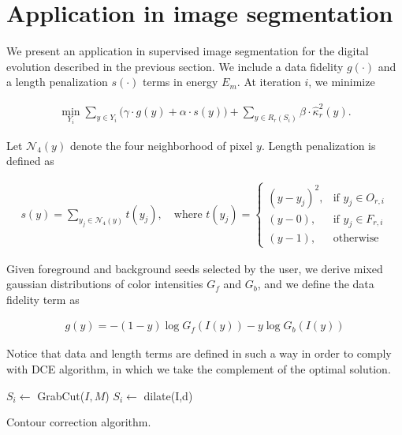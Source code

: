 \documentclass[runningheads]{llncs}
\begin{document}
\section{Application in image segmentation}

We present an application in supervised image segmentation for the digital evolution described in the previous section. We include a data fidelity $g(\cdot)$ and a length penalization $s(\cdot)$ terms in energy $E_m$. At iteration $i$, we minimize

\begin{align}			
	\min_{Y_i} \sum_{y \in Y_i}{\Big( \gamma \cdot g(y) + \alpha \cdot s(y) \Big)} + \sum_{y \in R_r(S_i)}{ \beta \cdot \hat{\kappa}_{r}^2(y)}.
	\label{eq:boundary-correction-energy}
\end{align}
	
	Let $\mathcal{N}_4(y)$ denote the four neighborhood of pixel $y$. Length penalization is defined as
	
	
	\begin{align*}
		s(y)=\sum_{y_j \in \mathcal{N}_4(y)}{ t(y_j) }, \quad \text{where } t(y_j) = \left\{\begin{array}{ll}
		(y-y_j)^2, & \text{if } y_j \in O_{r,i}\\
		(y-0), & \text{if } y_j \in F_{r,i}\\
		(y-1), & \text{otherwise }
		\end{array}\right.
	\end{align*}
	
	Given foreground and background seeds selected by the user, we derive mixed gaussian distributions  of color intensities $G_f$ and $G_b$, and we define the data fidelity term as
	
	\begin{align*}
		g(y) = -(1-y)\log{G_f(I(y))} - y\log{G_b(I(y))}
	\end{align*}
	
	Notice that data and length terms are defined in such a way in order to comply with DCE algorithm, in which we take the complement of the optimal solution. 
	
	
\begin{algorithm}[H]
 
 \BlankLine

 $S_i \longleftarrow$ GrabCut($I,M$)\;
 $S_i \longleftarrow $ dilate(I,d)\; 
 \label{alg:contour-correction} 
 \caption{Contour correction algorithm.}
\end{algorithm}	
\end{document}
